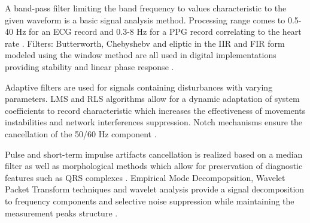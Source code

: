 \documentclass[journal]{IEEEtran}
\begin{document}
A band-pass filter limiting the band frequency to values characteristic to the given waveform is a basic signal analysis method. Processing range comes to 0.5-40 Hz for an ECG record and 0.3-8 Hz for a PPG record correlating to the heart rate \cite{3}. Filters: Butterworth, Chebyshebv and eliptic in the IIR and FIR form modeled using the window method are all used in digital implementations providing stability and linear phase response \cite{4}.

Adaptive filters are used for signals containing disturbances with varying parameters. LMS and RLS algorithms allow for a dynamic adaptation of system coefficients to record characteristic which increases the effectiveness of movements instabilities and network interferences suppression. Notch mechanisms ensure the cancellation of the 50/60 Hz component \cite{5}.

\newpage
Pulse and short-term impulse artifacts cancellation is realized based on a median filter as well as morphological methods which allow for preservation of diagnostic features such as QRS complexes \cite{6}. Empirical Mode Decompopsition, Wavelet Packet Transform techniques and wavelet analysis provide a signal decomposition to frequency components and selective noise suppression while maintaining the measurement peaks structure \cite{7}.
\end{document}
